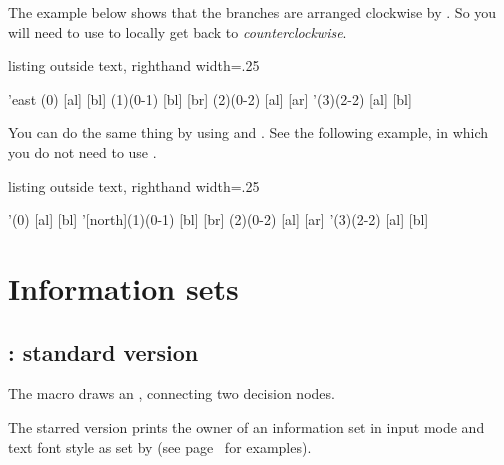 The example below shows that the branches are arranged clockwise by .
So you will need to use  to locally get back to \emph{counterclockwise}.

\begin{tcblisting}{listing outside text, righthand width=.25\linewidth}
\begin{istgame}[scale=.7,font=\scriptsize]
\setistgrowdirection'{east}
\istroot(0)              [al] [bl] \endist
\istroot[north](1)(0-1)  [bl] [br] \endist
{
\istroot[south](2)(0-2)  [al] [ar] \endist
}
\istroot'(3)(2-2)        [al] [bl] \endist
\end{istgame}
\end{tcblisting}

You can do the same thing by using \cmd{\setistgrowdirection} and . See the following example, in which
you do not need to use \cmd{\setxtgrowkey}.

\begin{tcblisting}{listing outside text, righthand width=.25\linewidth}
\begin{istgame}[scale=.7,font=\scriptsize]
\istroot'(0)             [al] [bl] \endist
\istroot'[north](1)(0-1) [bl] [br] \endist
\istroot[south](2)(0-2)  [al] [ar] \endist
\istroot'(3)(2-2)        [al] [bl] \endist
\end{istgame}
\end{tcblisting}


\section{Information sets}

\label{sec:infoset}

\subsection{\protect\cmd{\xtInfoset}: standard version}
\label{ssec:xtInfoset}

The macro \icmd{\xtInfoset} draws an , connecting two decision nodes.

The starred version \icmd{\xtInfoset*} prints the owner of an information set in input mode and text font style as set by \cmd{\setistmathTF(*)} (see page~\pageref{page:xtInfoset*} for examples).

